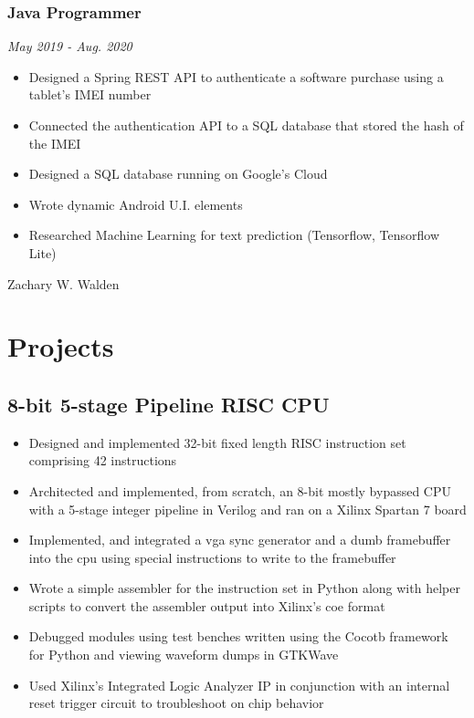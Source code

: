\documentclass{article}
\begin{document}
\begin{spacing}{.5}
		\subsubsection{\large{Java Programmer}} \hfill \small{\textsl{May 2019 - Aug. 2020}}
			\begin{itemize}[label=--,itemsep=-.35ex]
				\item \large{Designed a Spring REST API to authenticate a software purchase using a tablet's IMEI number}
				\item \large{Connected the authentication API to a SQL database that stored the hash of the IMEI}
				\item \large{Designed a SQL database running on Google's Cloud}
				\item \large{Wrote dynamic Android U.I. elements}
				\item \large{Researched Machine Learning for text prediction} \small{(Tensorflow, Tensorflow Lite)}
			\end{itemize}

\newpage

\begin{center}
	\begin{huge}
		Zachary W. Walden\\
	\end{huge}
\end{center}

\section{Projects}
	\subsection{8-bit 5-stage Pipeline RISC CPU \hfill {}}
		\begin{itemize}[label=--,itemsep=-.35ex]
			\item \large{Designed and implemented 32-bit fixed length RISC instruction set comprising 42 instructions}
			\item \large{Architected and implemented, from scratch, an 8-bit mostly bypassed CPU with a 5-stage integer pipeline in Verilog and ran on a Xilinx Spartan 7 board}
			\item \large{Implemented, and integrated a vga sync generator and a dumb framebuffer into the cpu using special instructions to write to the framebuffer}
			\item \large{Wrote a simple assembler for the instruction set in Python along with helper scripts to convert the assembler output into Xilinx's coe format}
			\item \large{Debugged modules using test benches written using the Cocotb framework for Python and viewing waveform dumps in GTKWave}
			\item \large{Used Xilinx's Integrated Logic Analyzer IP in conjunction with an internal reset trigger circuit to troubleshoot on chip behavior}
		\end{itemize}

\end{spacing}
\end{document}
